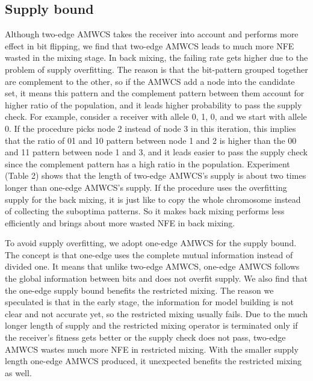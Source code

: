 \documentclass{sig-alternate-05-2015}
\begin{document}
\subsection{Supply bound}
Although two-edge AMWCS takes the receiver  into account and performs more effect in bit flipping, we find that two-edge AMWCS leads to much more NFE wasted in the mixing stage. In back mixing, the failing rate gets higher due to the problem of supply overfitting. The reason is that the bit-pattern grouped together are complement to the other, so if the AMWCS add a node into the candidate set, it means this pattern and the complement pattern between them account for higher ratio of the population, and it leads higher probability to pass the supply check. For example, consider a receiver with allele {0, 1, 0}, and we start with allele 0. If the procedure picks node 2 instead of node 3 in this iteration, this implies that the ratio of 01 and 10 pattern between node 1 and 2 is higher than the 00 and 11 pattern between node 1 and 3, and it leads easier to pass the supply check since the complement pattern has a high ratio in the population. Experiment (Table 2) shows that  the length of two-edge AMWCS’s supply is about two times longer than one-edge AMWCS’s supply. If the procedure uses the overfitting supply for the back mixing, it is just like to copy the whole chromosome instead of collecting the suboptima patterns. So it makes back mixing performs less efficiently   and brings about more  wasted NFE in back mixing.


To avoid supply overfitting, we adopt one-edge AMWCS for the supply bound. The concept is that one-edge uses the complete mutual information instead of divided one. It means that unlike two-edge AMWCS, one-edge AMWCS follows the global information between bits  and does not overfit supply. We also find that the one-edge supply bound benefits the restricted mixing. The reason we speculated is that in the early stage, the information for model building is not clear and not accurate yet, so the restricted mixing usually fails. Due to the much longer length of supply and the restricted mixing operator is terminated only if the receiver’s fitness gets better or the supply check does not pass, two-edge AMWCS  wastes much more NFE in restricted mixing. With the smaller supply length one-edge AMWCS produced, it unexpected benefits the restricted mixing as well.   
\end{document}
